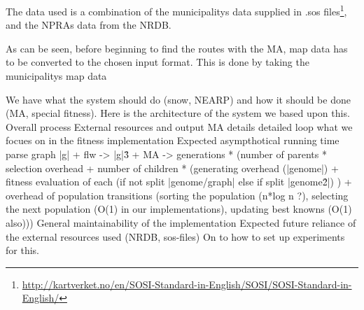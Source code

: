 The data used is a combination of the municipalitys data supplied in .sos files\footnote{\url{http://kartverket.no/en/SOSI-Standard-in-English/SOSI/SOSI-Standard-in-English/}}, and the NPRAs data from the NRDB. 

As can be seen, before beginning to find the routes with the MA, map data has to be converted to the chosen input format. This is done by taking the municipalitys map data






We have what the system should do (snow, NEARP) and how it should be done (MA, special fitness).
Here is the architecture of the system we based upon this.
	Overall process
	External resources and output
MA details
	detailed loop
	what we focues on in the fitness implementation
Expected asympthotical running time
	parse graph |g| + flw -> |g|\^3 + MA -> generations * (number of parents * selection overhead + number of children * (generating overhead (|genome|) + fitness evaluation of each (if not split |genome/graph| else if split |genome\^2|) ) + overhead of population transitions (sorting the population (n*log n ?), selecting the next population (O(1) in our implementations), updating best knowns (O(1) also)))
General maintainability of the implementation
Expected future reliance of the external resources used (NRDB, sos-files)
On to how to set up experiments for this.





